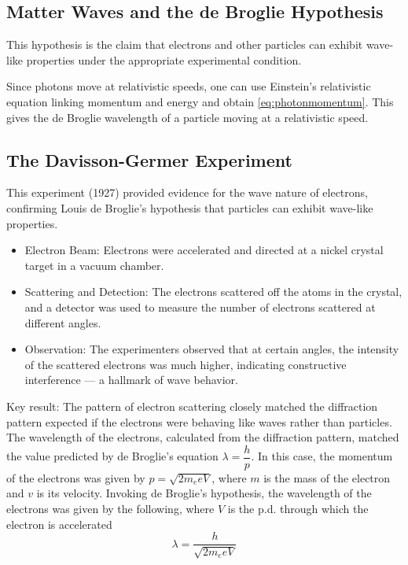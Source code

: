 \documentclass[a4paper,12pt]{article}
\begin{document}
\pagebreak

\subsection{Matter Waves and the de Broglie Hypothesis}

This hypothesis is the claim that electrons and other particles can exhibit wave-like properties under the appropriate experimental condition.

Since photons move at relativistic speeds, one can use Einstein's relativistic equation linking momentum and energy and obtain \cref{eq:photonmomentum}. This gives the de Broglie wavelength of a particle moving at a relativistic speed.

\subsection{The Davisson-Germer Experiment}

This experiment (1927) provided evidence for the wave nature of electrons, confirming Louis de Broglie's hypothesis that particles can exhibit wave-like properties.


\begin{itemize}
  \item Electron Beam: Electrons were accelerated and directed at a nickel crystal target in a vacuum chamber.
  \item Scattering and Detection: The electrons scattered off the atoms in the crystal, and a detector was used to measure the number of electrons scattered at different angles.
  \item Observation: The experimenters observed that at certain angles, the intensity of the scattered electrons was much higher, indicating constructive interference — a hallmark of wave behavior.
\end{itemize}

Key result:
The pattern of electron scattering closely matched the diffraction pattern expected if the electrons were behaving like waves rather than particles. The wavelength of the electrons, calculated from the diffraction pattern, matched the value predicted by de Broglie's equation $\lambda = \dfrac{h}{p}$.
In this case, the momentum of the electrons was given by $p = \sqrt{2m_eeV}$, where $m$ is the mass of the electron and $v$ is its velocity. Invoking de Broglie's hypothesis, the wavelength of the electrons was given by the following, where $V$ is the p.d. through which the electron is accelerated \begin{equation}\label{eq:davisson}
  \lambda = \dfrac{h}{\sqrt{2m_eeV}}
\end{equation}
\end{document}
